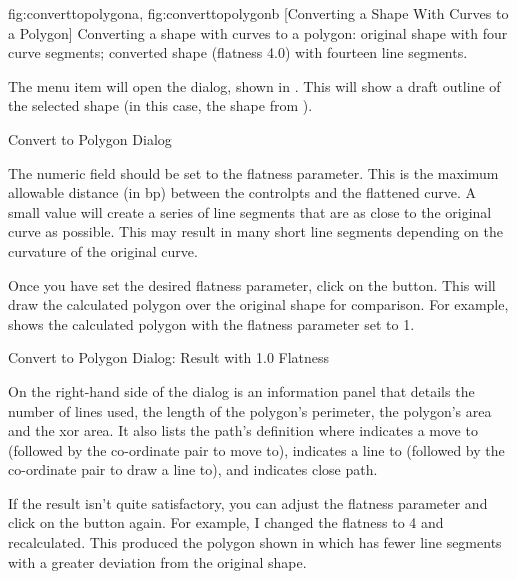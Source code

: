 {
  {fig:converttopolygona}{}{},
  {fig:converttopolygonb}{}{}
}
[Converting a Shape With Curves to a Polygon]
{Converting a shape with curves to a polygon:
 original shape with four
curve segments;
 converted shape (flatness 4.0) 
with fourteen line segments.}



The  menu item will open the
 dialog, shown in .
This will show a draft outline of the selected shape (in this case,
the shape from ).

{}
{Convert to Polygon Dialog}


The  numeric field should be set to the
flatness parameter. This is the maximum allowable distance (in \gls{bp})
between the \glspl{controlpt} and the flattened \gls{curve}. A small
value will create a series of line segments that are as close to the
original curve as possible. This may result in many short line
segments depending on the curvature of the original \gls{curve}.


Once you have set the desired flatness parameter, click on the
 button. This will draw the calculated
polygon over the original shape for comparison. For example, 
 shows the calculated polygon with
the flatness parameter set to 1.

{}
{Convert to Polygon Dialog: Result with 1.0 Flatness}

On the right-hand side of the  dialog is an
information panel that details the number of lines used, the length
of the polygon's perimeter, the polygon's area and the \gls{xor} area.
It also lists the path's definition where  indicates a move to
(followed by the co-ordinate pair to move to),  indicates a line to
(followed by the co-ordinate pair to draw a line to), and 
indicates close path.

If the result isn't quite satisfactory, you can adjust the flatness
parameter and click on the  button again.
For example, I changed the flatness to 4 and recalculated. This
produced the polygon shown in  which
has fewer line segments with a greater deviation from the original
shape.

